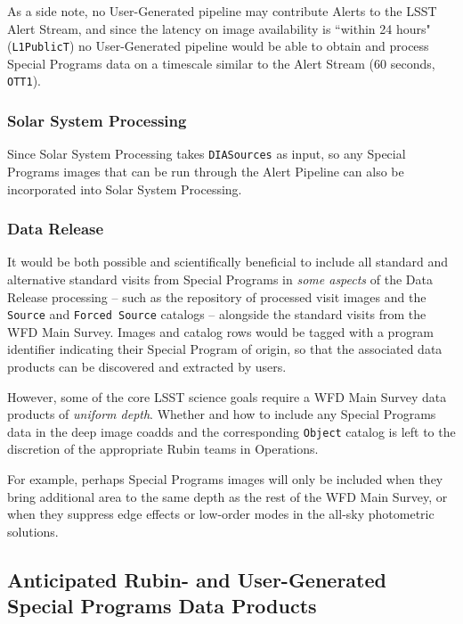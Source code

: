 \documentclass[DM,lsstdoc,toc]{lsstdoc}
\begin{document}
As a side note, no User-Generated pipeline may contribute Alerts to the LSST Alert Stream, and since the latency on image availability is ``within 24 hours" ({\tt L1PublicT}) no User-Generated pipeline would be able to obtain and process Special Programs data on a timescale similar to the Alert Stream (60 seconds, {\tt OTT1}).

\subsubsection{Solar System Processing}

Since Solar System Processing takes \texttt{DIASources} as input, so any Special Programs images that can be run through the Alert Pipeline can also be incorporated into Solar System Processing.

\subsubsection{Data Release}

It would be both possible and scientifically beneficial to include all standard and alternative standard visits from Special Programs in {\it some aspects} of the Data Release processing -- such as the repository of processed visit images and the {\tt Source} and {\tt Forced Source} catalogs -- alongside the standard visits from the WFD Main Survey.
Images and catalog rows would be tagged with a program identifier indicating their Special Program of origin, so that the associated data products can be discovered and extracted by users.

However, some of the core LSST science goals require a WFD Main Survey data products of {\it uniform depth}.
Whether and how to include any Special Programs data in the deep image coadds and the corresponding {\tt Object} catalog is left to the discretion of the appropriate Rubin teams in Operations.

For example, perhaps Special Programs images will only be included when they bring additional area to the same depth as the rest of the WFD Main Survey, or when they suppress edge effects or low-order modes in the all-sky photometric solutions.


\subsection{Anticipated Rubin- and User-Generated Special Programs Data Products}\label{ssec:proc_spdp}
\end{document}
